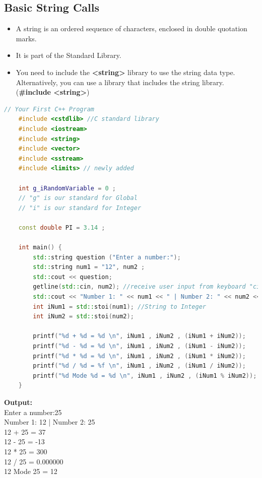 \documentclass[12pt , a4paper]{article}
\newcommand{\hl}[1]{\colorbox{coolblack}{\color{cream}\textbf{#1}\color{black}}}
\begin{document}
	\subsection{Basic String Calls}
		\begin{itemize}
			\item A string is an ordered sequence of characters, enclosed in double quotation marks.\\
			\item It is part of the Standard Library.\\
			\item You need to include the \textbf{<string>} library to use the string data type. Alternatively, you can use a library that includes the string library. (\hl {\#include <string>})\\
		\end{itemize}
	\begin{lstlisting}[language=C++]
	// Your First C++ Program
	#include <cstdlib> //C standard library
	#include <iostream>
	#include <string>
	#include <vector>
	#include <sstream>
	#include <limits> // newly added
	
	int g_iRandomVariable = 0 ;
	// "g" is our standard for Global
	// "i" is our standard for Integer
	
	const double PI = 3.14 ;
	
	int main() {
	    std::string question ("Enter a number:");
	    std::string num1 = "12", num2 ;
	    std::cout << question;
	    getline(std::cin, num2); //receive user input from keyboard "cin"
	    std::cout << "Number 1: " << num1 << " | Number 2: " << num2 <<"\n" ;
	    int iNum1 = std::stoi(num1); //String to Integer
	    int iNum2 = std::stoi(num2);
	
	    printf("%d + %d = %d \n", iNum1 , iNum2 , (iNum1 + iNum2));
	    printf("%d - %d = %d \n", iNum1 , iNum2 , (iNum1 - iNum2));
	    printf("%d * %d = %d \n", iNum1 , iNum2 , (iNum1 * iNum2));
	    printf("%d / %d = %f \n", iNum1 , iNum2 , (iNum1 / iNum2));
	    printf("%d Mode %d = %d \n", iNum1 , iNum2 , (iNum1 % iNum2));
	}
	\end{lstlisting}

	\begin{tcolorbox}
	\textbf{Output:}\\
	Enter a number:25\\
	Number 1: 12 | Number 2: 25\\
	12 + 25 = 37\\
	12 - 25 = -13\\
	12 * 25 = 300\\
	12 / 25 = 0.000000\\
	12 Mode 25 = 12
	\end{tcolorbox}
\end{document}
